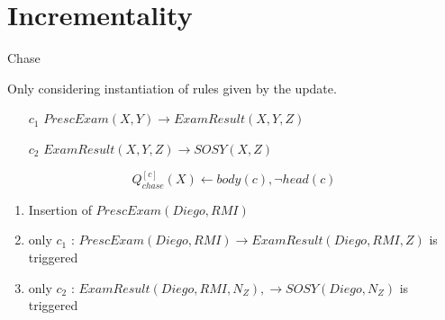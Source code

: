\section{Incrementality}
\begin{frame}{Chase}
    \begin{block}{}
        Only considering instantiation of rules given by the update.
        \begin{itemize}
            \item[$c_1$] $PrescExam(X, Y) \to ExamResult(X, Y, Z)$
            \item[$c_2$] $ExamResult(X, Y, Z) \to SOSY(X, Z)$
        \end{itemize}

        \[ Q_{chase}^{[c]}(X) \leftarrow body(c), \lnot head(c) \]
    \end{block}

    \vfill

    \begin{enumerate}
        \item Insertion of $PrescExam(Diego, RMI)$
              \pause
        \item only $c_1$ : $PrescExam(Diego, RMI) \to ExamResult(Diego, RMI, Z)$ is triggered
              \pause
        \item only $c_2$ : $ExamResult(Diego, RMI, N_Z), \to SOSY(Diego, N_Z)$ is triggered\\
    \end{enumerate}

\end{frame}

